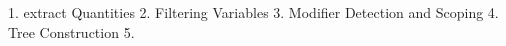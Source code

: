 1. extract Quantities
2. Filtering Variables
3. Modifier Detection and Scoping
4. Tree Construction
5.
